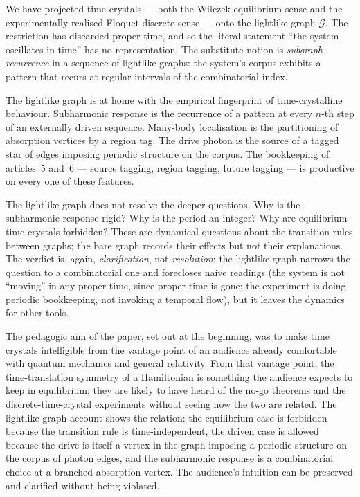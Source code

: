 \documentclass[11pt]{article}
\begin{document}
We have projected time crystals --- both the Wilczek equilibrium sense and the experimentally realised Floquet discrete sense --- onto the lightlike graph $\mathcal{G}$. The restriction has discarded proper time, and so the literal statement ``the system oscillates in time'' has no representation. The substitute notion is \emph{subgraph recurrence} in a sequence of lightlike graphs: the system's corpus exhibits a pattern that recurs at regular intervals of the combinatorial index.

The lightlike graph is at home with the empirical fingerprint of time-crystalline behaviour. Subharmonic response is the recurrence of a pattern at every $n$-th step of an externally driven sequence. Many-body localisation is the partitioning of absorption vertices by a region tag. The drive photon is the source of a tagged star of edges imposing periodic structure on the corpus. The bookkeeping of articles~5 and~6 --- source tagging, region tagging, future tagging --- is productive on every one of these features.

The lightlike graph does not resolve the deeper questions. Why is the subharmonic response rigid? Why is the period an integer? Why are equilibrium time crystals forbidden? These are dynamical questions about the transition rules between graphs; the bare graph records their effects but not their explanations. The verdict is, again, \emph{clarification}, not \emph{resolution}: the lightlike graph narrows the question to a combinatorial one and forecloses naive readings (the system is not ``moving'' in any proper time, since proper time is gone; the experiment is doing periodic bookkeeping, not invoking a temporal flow), but it leaves the dynamics for other tools.

The pedagogic aim of the paper, set out at the beginning, was to make time crystals intelligible from the vantage point of an audience already comfortable with quantum mechanics and general relativity. From that vantage point, the time-translation symmetry of a Hamiltonian is something the audience expects to keep in equilibrium; they are likely to have heard of the no-go theorems and the discrete-time-crystal experiments without seeing how the two are related. The lightlike-graph account shows the relation: the equilibrium case is forbidden because the transition rule is time-independent, the driven case is allowed because the drive is itself a vertex in the graph imposing a periodic structure on the corpus of photon edges, and the subharmonic response is a combinatorial choice at a branched absorption vertex. The audience's intuition can be preserved and clarified without being violated.
\end{document}
